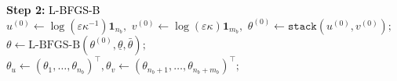 \begin{algorithm}[htbp]
\noindent \textbf{Step 2:} \textcolor{black}{L-BFGS-B}\\

\nl  $u^{(0)}\gets \log(\varepsilon\kappa^{-1}) \mathbf 1_{n_b},$ $v^{(0)} \gets \log(\varepsilon\kappa) \mathbf 1_{m_b},$ $\theta^{(0)} \gets \texttt{stack}(u^{(0)}, v^{(0)});$\\
\nl   $\theta \gets \text{L-BFGS-B}(\theta^{(0)}, \underline{\theta}, \bar{\theta});$\\
\nl   $\theta_u \gets (\theta_1, \ldots, \theta_{n_b})^\top, \theta_v \gets(\theta_{n_b+1}, \ldots, \theta_{n_b+m_b})^\top;$\\
\\
\\
\nl   {}
\end{algorithm}

